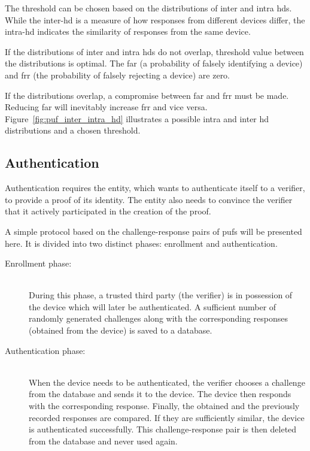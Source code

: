 The threshold can be chosen based on the distributions of inter and intra \glspl{hd}. While the inter-\gls{hd} is a measure of how responses from different devices differ, the intra-\gls{hd} indicates the similarity of responses from the same device.

If the distributions of inter and intra \glspl{hd} do not overlap, threshold value between the distributions is optimal. The \gls{far} (a probability of falsely identifying a device) and \gls{frr} (the probability of falsely rejecting a device) are zero.

If the distributions overlap, a compromise between \gls{far} and \gls{frr} must be made. Reducing \gls{far} will inevitably increase \gls{frr} and vice versa. Figure~\ref{fig:puf_inter_intra_hd} illustrates a possible intra and inter \gls{hd} distributions and a chosen threshold.

\subsection{Authentication}

Authentication requires the entity, which wants to authenticate itself to a verifier, to provide a proof of its identity. The entity also needs to convince the verifier that it actively participated in the creation of the proof.\cite{Maes2012}

A simple protocol based on the challenge-response pairs of \glspl{puf} will be presented here. It is divided into two distinct phases: enrollment and authentication.\cite{Devadas2008}

\begin{description}
    \item[Enrollment phase:] \hfill \\ During this phase, a trusted third party (the verifier) is in possession of the device which will later be authenticated. A sufficient number of randomly generated challenges along with the corresponding responses (obtained from the device) is saved to a database.
    \item[Authentication phase:] \hfill \\ When the device needs to be authenticated, the verifier chooses a challenge from the database and sends it to the device. The device then responds with the corresponding response. Finally, the obtained and the previously recorded responses are compared. If they are sufficiently similar, the device is authenticated successfully. This challenge-response pair is then deleted from the database and never used again.
\end{description}

